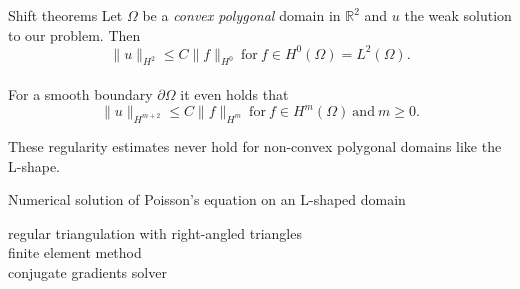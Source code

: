 \documentclass{beamer}
\begin{document}
\begin{frame}{Shift theorems}
Let $\Omega$ be a \emph{convex polygonal} domain in $\mathbb{R}^2$ and $u$ the weak solution to our problem. Then 
\begin{equation}
	\| u \|_{H^2} \leq C \| f \|_{H^0} \ \text{for} \ f \in H^0(\Omega) = L^2(\Omega).
\end{equation}\\[0.5ex]

For a smooth boundary $\partial \Omega$ it even holds that \begin{equation*}
	\|u\|_{H^{m+2}} \leq C \|f\|_{H^m} \ \text{for} \ f \in  H^m(\Omega) \ \text{and} \ m \geq 0.
\end{equation*}


These regularity estimates never hold for non-convex polygonal domains like the L-shape.

\end{frame}



\begin{frame}{Numerical solution of Poisson's equation on an L-shaped domain}

regular triangulation with right-angled triangles\\
finite element method\\
conjugate gradients solver\\



\end{frame}
\end{document}
